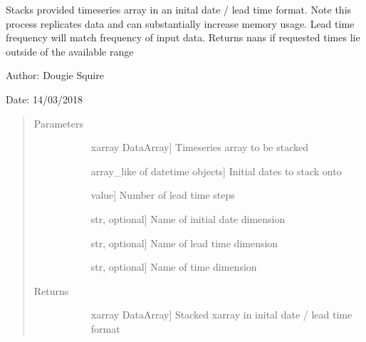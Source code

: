 \documentclass[letterpaper,10pt,english]{sphinxmanual}
\begin{document}
\begin{fulllineitems}
\label{\detokenize{utils_doc:utils.stack_by_init_date}}
Stacks provided timeseries array in an inital date / lead time format. Note this process                 replicates data and can substantially increase memory usage. Lead time frequency will match                 frequency of input data. Returns nans if requested times lie outside of the available range

\begin{DUlineblock}{0em}
\item[] Author: Dougie Squire
\item[] Date: 14/03/2018
\end{DUlineblock}
\begin{quote}\begin{description}
\item[{Parameters}] \leavevmode\begin{description}
\item[{}] \leavevmode{[}xarray DataArray{]}
Timeseries array to be stacked

\item[{}] \leavevmode{[}array\_like of datetime objects{]}
Initial dates to stack onto

\item[{}] \leavevmode{[}value{]}
Number of lead time steps

\item[{}] \leavevmode{[}str, optional{]}
Name of initial date dimension

\item[{}] \leavevmode{[}str, optional{]}
Name of lead time dimension

\item[{}] \leavevmode{[}str, optional{]}
Name of time dimension

\end{description}

\item[{Returns}] \leavevmode\begin{description}
\item[{}] \leavevmode{[}xarray DataArray{]}
Stacked xarray in inital date / lead time format


\end{description}
\end{description}
\end{quote}
\end{fulllineitems}
\end{document}

